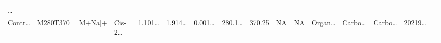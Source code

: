\documentclass[
]{article}
\begin{document}
\begin{longtable}[]{@{}llllllllllllllll@{}}
\begin{minipage}[t]{0.02\columnwidth}
\ldots{}\strut
\end{minipage}\tabularnewline
\begin{minipage}[t]{0.04\columnwidth}\raggedright
Contr\ldots{}\strut
\end{minipage} & \begin{minipage}[t]{0.04\columnwidth}\raggedright
M280T370\strut
\end{minipage} & \begin{minipage}[t]{0.04\columnwidth}\raggedright
{[}M+Na{]}+\strut
\end{minipage} & \begin{minipage}[t]{0.04\columnwidth}\raggedright
Cis-2\ldots{}\strut
\end{minipage} & \begin{minipage}[t]{0.04\columnwidth}\raggedright
1.101\ldots{}\strut
\end{minipage} & \begin{minipage}[t]{0.04\columnwidth}\raggedright
1.914\ldots{}\strut
\end{minipage} & \begin{minipage}[t]{0.04\columnwidth}\raggedright
0.001\ldots{}\strut
\end{minipage} & \begin{minipage}[t]{0.04\columnwidth}\raggedright
280.1\ldots{}\strut
\end{minipage} & \begin{minipage}[t]{0.04\columnwidth}\raggedright
370.25\strut
\end{minipage} & \begin{minipage}[t]{0.04\columnwidth}\raggedright
NA\strut
\end{minipage} & \begin{minipage}[t]{0.03\columnwidth}\raggedright
NA\strut
\end{minipage} & \begin{minipage}[t]{0.04\columnwidth}\raggedright
Organ\ldots{}\strut
\end{minipage} & \begin{minipage}[t]{0.04\columnwidth}\raggedright
Carbo\ldots{}\strut
\end{minipage} & \begin{minipage}[t]{0.04\columnwidth}\raggedright
Carbo\ldots{}\strut
\end{minipage} & \begin{minipage}[t]{0.04\columnwidth}\raggedright
20219\ldots{}\strut
\end{minipage} & \begin{minipage}[t]{0.02\columnwidth}\raggedright

\end{minipage}
\end{longtable}
\end{document}
